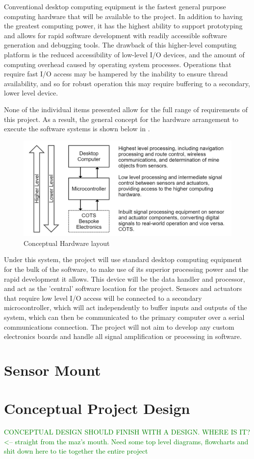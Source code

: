 \documentclass[main.tex]{subfiles}
\begin{document}
\begin{itemize}
Conventional desktop computing equipment is the fastest general purpose computing hardware that will be available to the project. In addition to having the greatest computing power, it has the highest ability to support prototyping and allows for rapid software development with readily accessible software generation and debugging tools. The drawback of this higher-level computing platform is the reduced accessibility of low-level I/O devices, and the amount of computing overhead caused by operating system processes. Operations that require fast I/O access may be hampered by the inability to ensure thread availability, and so for robust operation this may require buffering to a secondary, lower level device.
\end{itemize}

None of the individual items presented allow for the full range of requirements of this project. As a result, the general concept for the hardware arrangement to execute the software systems is shown below in .
\begin{figure}[ht]
\includegraphics[width = \textwidth]{4-ConceptDesign/electronics.png}
\centering
\caption{Conceptual Hardware layout} 
\end{figure}

Under this system, the project will use standard desktop computing equipment for the bulk of the software, to make use of its superior processing power and the rapid development it allows. This device will be the data handler and processor, and act as the 'central' software location for the project. Sensors and actuators that require low level I/O access will be connected to a secondary microcontroller, which will act independently to buffer inputs and outputs of the system, which can then be communicated to the primary computer over a serial communications connection. The project will not aim to develop any custom electronics boards and handle all signal amplification or processing in software.

\section{Sensor Mount}

\section{Conceptual Project Design}
\textcolor{green}{CONCEPTUAL DESIGN SHOULD FINISH WITH A DESIGN. WHERE IS IT? <-- straight from the maz's mouth. Need some top level diagrams, flowcharts and shit down here to tie together the entire project}
\end{document}
